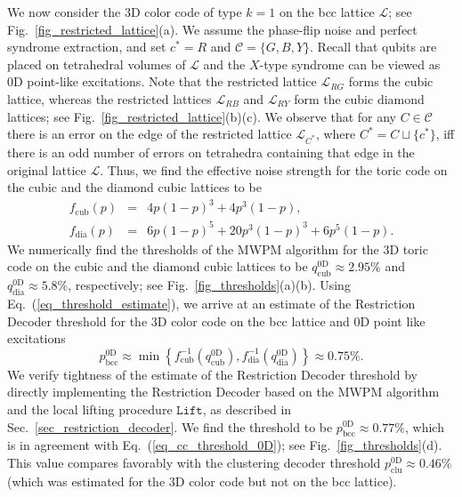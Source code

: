 \documentclass[onecolumn,letterpaper,11pt,accepted=2022-12-19]{quantumarticle}
\theoremstyle{definition}
\theoremstyle{lemma}
\theoremstyle{theorem}
\theoremstyle{corollary}
\begin{document}
{We now consider the 3D color code of type $k=1$ on the bcc lattice $\mathcal{L}$; see Fig.~\ref{fig_restricted_lattice}(a).
We assume the phase-flip noise and perfect syndrome extraction, and set $c^* = R$ and $\mathcal{C} = \{ G, B, Y\}$.
Recall that qubits are placed on tetrahedral volumes of $\mathcal{L}$ and the $X$-type syndrome can be viewed as 0D point-like excitations.
Note that the restricted lattice $\mathcal{L}_{RG}$ forms the cubic lattice, whereas the restricted lattices $\mathcal{L}_{RB}$ and $\mathcal{L}_{RY}$ form the cubic diamond lattices; see Fig.~\ref{fig_restricted_lattice}(b)(c).
We observe that for any $C\in\mathcal C$ there is an error on the edge of the restricted lattice $\mathcal{L}_{C^*}$, where $C^* = C\sqcup\{c^*\}$, iff there is an odd number of errors on tetrahedra containing that edge in the original lattice $\mathcal{L}$.
Thus, we find the effective noise strength for the toric code on the cubic and the diamond cubic lattices to be
\begin{eqnarray}
f_{\textrm{cub}}(p) &=& 4p(1-p)^3+ 4p^3(1-p),\\
f_{\textrm{dia}}(p) &=& 6p(1-p)^5+ 20p^3(1-p)^3 + 6p^5(1-p).
\end{eqnarray}
We numerically find the thresholds of the MWPM algorithm for the 3D toric code on the cubic and the diamond cubic lattices to be $q^{\textrm{0D}}_{\textrm{cub}} \approx 2.95\%$ and $q^{\textrm{0D}}_{\textrm{dia}} \approx 5.8\%$, respectively; see Fig.~\ref{fig_thresholds}(a)(b).
Using Eq.~(\ref{eq_threshold_estimate}), we arrive at an estimate of the Restriction Decoder threshold for the 3D color code on the bcc lattice and 0D point like excitations
\begin{equation}
\label{eq_cc_threshold_0D}
p^{\textrm{0D}}_{\textrm{bcc}} \approx \min \left\{ f_{\textrm{cub}}^{-1}(q^{\textrm{0D}}_{\textrm{cub}}), 
f_{\textrm{dia}}^{-1}(q^{\textrm{0D}}_{\textrm{dia}})\right\} \approx 0.75\%.
\end{equation}
We verify tightness of the estimate of the Restriction Decoder threshold by directly implementing the Restriction Decoder based on the MWPM algorithm and the local lifting procedure $\mathtt{Lift}$, as described in Sec.~\ref{sec_restriction_decoder}.
We find the threshold to be $p^{\textrm{0D}}_{\textrm{bcc}}\approx 0.77\%$, which is in agreement with Eq.~(\ref{eq_cc_threshold_0D}); see Fig.~\ref{fig_thresholds}(d).
This value compares favorably with the clustering decoder threshold $p^{\textrm{0D}}_{\textrm{clu}}\approx 0.46\%$ \cite{Brown2015} (which was estimated for the 3D color code but not on the bcc lattice).

}
\end{document}
